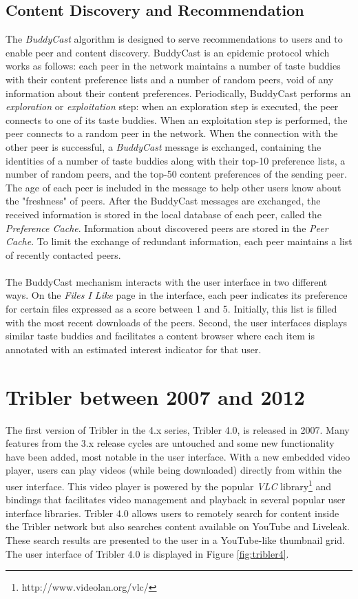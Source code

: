 \subsection{Content Discovery and Recommendation}
The \emph{BuddyCast} algorithm is designed to serve recommendations to users and to enable peer and content discovery. BuddyCast is an epidemic protocol which works as follows: each peer in the network maintains a number of taste buddies with their content preference lists and a number of random peers, void of any information about their content preferences. Periodically, BuddyCast performs an \emph{exploration} or \emph{exploitation} step: when an exploration step is executed, the peer connects to one of its taste buddies. When an exploitation step is performed, the peer connects to a random peer in the network. When the connection with the other peer is successful, a \emph{BuddyCast} message is exchanged, containing the identities of a number of taste buddies along with their top-10 preference lists, a number of random peers, and the top-50 content preferences of the sending peer. The age of each peer is included in the message to help other users know about the "freshness" of peers. After the BuddyCast messages are exchanged, the received information is stored in the local database of each peer, called the \emph{Preference Cache}. Information about discovered peers are stored in the \emph{Peer Cache}. To limit the exchange of redundant information, each peer maintains a list of recently contacted peers.\\\\
The BuddyCast mechanism interacts with the user interface in two different ways. On the \emph{Files I Like} page in the interface, each peer indicates its preference for certain files expressed as a score between 1 and 5. Initially, this list is filled with the most recent downloads of the peers. Second, the user interfaces displays similar taste buddies and facilitates a content browser where each item is annotated with an estimated interest indicator for that user.

\section{Tribler between 2007 and 2012}
The first version of Tribler in the 4.x series, Tribler 4.0, is released in 2007\cite{tribler4tf}. Many features from the 3.x release cycles are untouched and some new functionality have been added, most notable in the user interface. With a new embedded video player, users can play videos (while being downloaded) directly from within the user interface. This video player is powered by the popular \emph{VLC} library\footnote{http://www.videolan.org/vlc/} and bindings that facilitates video management and playback in several popular user interface libraries. Tribler 4.0 allows users to remotely search for content inside the Tribler network but also searches content available on YouTube and Liveleak. These search results are presented to the user in a YouTube-like thumbnail grid. The user interface of Tribler 4.0 is displayed in Figure \ref{fig:tribler4}.\\

